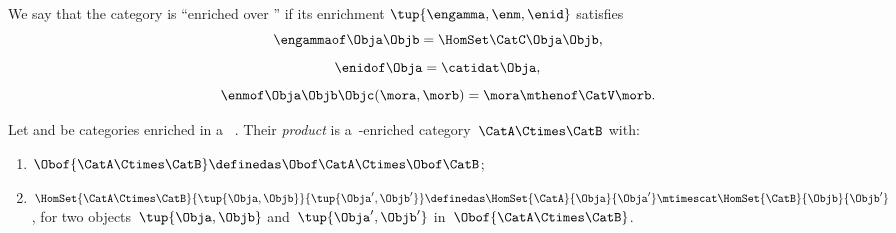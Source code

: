 

\begin{ctdefinition}\label{def:enriched_cat}
    We say that the category \CatC is ``enriched over \CatV'' if its enrichment $\tup{\engamma,\enm,\enid}$ satisfies
    \begin{equation}
        \engammaof\Obja\Objb = \HomSet\CatC\Obja\Objb,
    \end{equation}
    \begin{equation}
        \enidof\Obja = \catidat\Obja,
    \end{equation}
    \begin{equation}
        \enmof\Obja\Objb\Objc(\mora, \morb) = \mora \mthenof\CatV \morb.
    \end{equation}
\end{ctdefinition}

\begin{definition}
    \label{def:prod_enrich_cat}
    Let \CatA and \CatB be categories enriched in a ~\CatV.
    Their \emph{product} is a~\CatV-enriched category~$\CatA\Ctimes \CatB$ with:
    \begin{enumerate}
        \item $\Obof{\CatA\Ctimes \CatB}\definedas \Obof\CatA \Ctimes \Obof\CatB$;
        \item $\HomSet{\CatA\Ctimes \CatB}{\tup{\Obja,\Objb}}{\tup{\Obja',\Objb'}}\definedas \HomSet{\CatA}{\Obja}{\Obja'}\mtimescat \HomSet{\CatB}{\Objb}{\Objb'}$, for two objects~$\tup{\Obja,\Objb}$ and~$\tup{\Obja',\Objb'}$ in~$\Obof{\CatA\Ctimes \CatB}$.
    \end{enumerate}
\end{definition}


